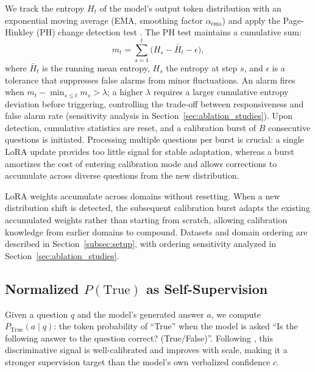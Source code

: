 \documentclass[11pt]{article}
\begin{document}
We track the entropy $H_t$ of the model's output token distribution with an exponential moving average (EMA, smoothing factor $\alpha_{\text{ema}}$) and apply the Page-Hinkley (PH) change detection test \cite{page_continuous_1954}. The PH test maintains a cumulative sum:
\begin{equation} \label{eq:ph}
    m_t = \sum_{s=1}^{t} \big(H_s - \bar{H}_t - \epsilon\big),
\end{equation}
where $\bar{H}_t$ is the running mean entropy, $H_s$ the entropy at step $s$, and $\epsilon$ is a tolerance that suppresses false alarms from minor fluctuations. An alarm fires when $m_t - \min_{s \leq t} m_s > \lambda$; a higher $\lambda$ requires a larger cumulative entropy deviation before triggering, controlling the trade-off between responsiveness and false alarm rate (sensitivity analysis in Section~\ref{sec:ablation_studies}). Upon detection, cumulative statistics are reset, and a calibration burst of $B$ consecutive questions is initiated. 
Processing multiple questions per burst is crucial: a single LoRA update provides too little signal for stable adaptation, whereas a burst amortizes the cost of entering calibration mode and allows corrections to accumulate across diverse questions from the new distribution.

LoRA weights accumulate across domains without resetting. When a new distribution shift is detected, the subsequent calibration burst adapts the existing accumulated weights rather than starting from scratch, allowing calibration knowledge from earlier domains to compound. Datasets and domain ordering are described in Section~\ref{subsec:setup}, with ordering sensitivity analyzed in Section~\ref{sec:ablation_studies}.

\subsection[Normalized P(True) as Self-Supervision]{Normalized $P(\text{True})$ as Self-Supervision} \label{subsec:signal}
Given a question $q$ and the model's generated answer $a$, we compute $P_{\text{True}}(a \mid q)$: the token probability of ``True'' when the model is asked ``Is the following answer to the question correct? (True/False)''. Following \citet{kadavath_language_2022}, this discriminative signal is well-calibrated and improves with scale, making it a stronger supervision target than the model's own verbalized confidence $c$.
\end{document}
